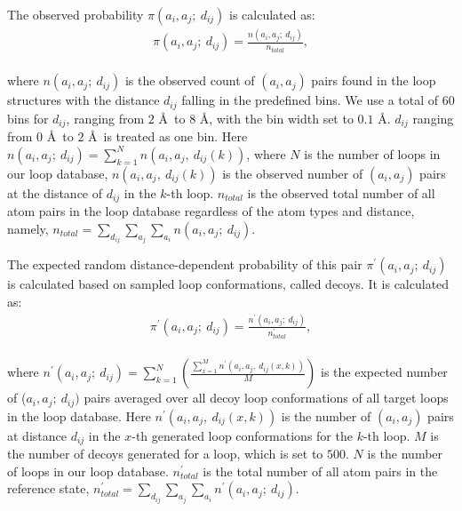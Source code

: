 The observed probability $\pi(a_{i},a_{j};\:d_{ij})$ is calculated
as:
\begin{equation}
\left. \begin{aligned}
   \pi(a_{i},a_{j};\:d_{ij}) =
   \frac{n(a_{i},a_{j};\:d_{ij})}{n_{total}},
  \end{aligned} \right.
\end{equation}\\
where $n(a_{i},a_{j};\:d_{ij})$ is the observed count of $(a_i,
a_j)$ pairs found in the loop structures with the distance $d_{ij}$
falling in the predefined bins. We use a total of $60$ bins for
$d_{ij}$, ranging from $2$ \r{A}\ to $8$ \r{A}, with the bin width
set to $0.1$ \r{A}. $d_{ij}$ ranging from $0$ \r{A}\ to $2$ \r{A}\
is treated as one bin. Here $n(a_{i},a_{j};\:d_{ij}) =
\sum\limits_{k=1}^{N} n(a_{i},a_{j},\:d_{ij}(k))$, where $N$ is the
number of loops in our loop database, $n(a_{i},a_{j},\:d_{ij}(k))$
is the observed number of $(a_i, a_j)$ pairs at the distance of
$d_{ij}$ in the $k$-th loop. $n_{total}$ is the observed total
number of all atom pairs in the loop database regardless of the atom
types and distance, namely, $n_{total} = \sum\limits_{d_{ij}}
\sum\limits_{a_{j}} \sum\limits_{a_{i}} n(a_{i},a_{j};\:d_{ij})$.

The expected random distance-dependent probability of this pair
$\pi^{\prime}(a_{i},a_{j};\:d_{ij})$ is calculated based on sampled
loop conformations, called decoys. It is calculated as:
\begin{equation}
\left. \begin{aligned}
   \pi^{\prime}(a_{i},a_{j};\:d_{ij}) =
   \frac{n^{\prime}(a_{i},a_{j};\:d_{ij})}{n^{\prime}_{total}},
  \end{aligned} \right.
\end{equation}\\
where $n^{\prime}(a_{i},a_{j};\:d_{ij}) = \sum\limits_{k=1}^{N}
(\frac{\sum\limits_{x=1}^{M}
n^{\prime}(a_{i},a_{j},\:d_{ij}(x,k))}{M})$ is the expected number
of ($a_i, a_j;\:d_{ij})$ pairs averaged over all decoy loop
conformations of all target loops in the loop database. Here
$n^{\prime}(a_{i},a_{j},\:d_{ij}(x,k))$ is the number of $(a_i,
a_j)$ pairs at distance $d_{ij}$ in the $x$-th generated loop
conformations for the $k$-th loop. $M$ is the number of decoys
generated for a loop, which is set to $500$. $N$ is the number of
loops in our loop database. $n^{\prime}_{total}$ is the total number
of all atom pairs in the reference state, $n^{\prime}_{total} =
\sum\limits_{d_{ij}} \sum\limits_{a_{j}} \sum\limits_{a_{i}}
n^{\prime}(a_{i},a_{j};\:d_{ij})$.

